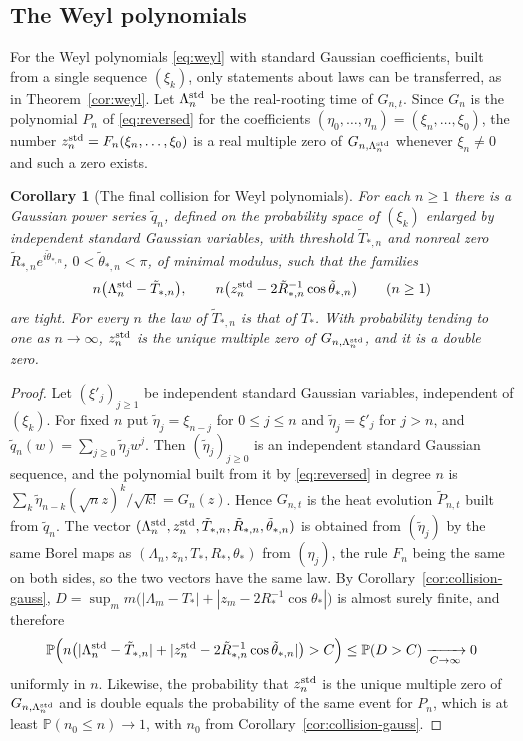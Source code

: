 \documentclass[11pt]{amsart}
\newtheorem{corollary}[theorem]{Corollary}
\theoremstyle{definition}
\theoremstyle{remark}
\numberwithin{equation}{section}
\newcommand{\PP}{\mathbb{P}}
\begin{document}
\subsection{The Weyl polynomials}\label{subsec:collision-weyl}
For the Weyl polynomials \eqref{eq:weyl} with standard Gaussian coefficients, built from a single sequence $(\xi_k)$, only statements about laws can be transferred, as in Theorem~\ref{cor:weyl}. Let $\Lambda_n^{\rm std}$ be the real-rooting time of $G_{n,t}$. Since $G_n$ is the polynomial $P_n$ of \eqref{eq:reversed} for the coefficients $(\eta_0,\dots,\eta_n)=(\xi_n,\dots,\xi_0)$, the number $z_n^{\rm std}=F_n(\xi_n,\dots,\xi_0)$ is a real multiple zero of $G_{n,\Lambda_n^{\rm std}}$ whenever $\xi_n\ne0$ and such a zero exists.

\begin{corollary}[The final collision for Weyl polynomials]\label{cor:collision-weyl}
For each $n\ge1$ there is a Gaussian power series $\tilde q_n$, defined on the probability space of $(\xi_k)$ enlarged by independent standard Gaussian variables, with threshold $\tilde T_{*,n}$ and nonreal zero $\tilde R_{*,n}e^{i\tilde\theta_{*,n}}$, $0<\tilde\theta_{*,n}<\pi$, of minimal modulus, such that the families
\[
n\bigl(\Lambda_n^{\rm std}-\tilde T_{*,n}\bigr),\qquad n\bigl(z_n^{\rm std}-2\tilde R_{*,n}^{-1}\cos\tilde\theta_{*,n}\bigr)\qquad(n\ge1)
\]
are tight. For every $n$ the law of $\tilde T_{*,n}$ is that of $T_*$. With probability tending to one as $n\to\infty$, $z_n^{\rm std}$ is the unique multiple zero of $G_{n,\Lambda_n^{\rm std}}$, and it is a double zero.
\end{corollary}

\begin{proof}
Let $(\xi'_j)_{j\ge1}$ be independent standard Gaussian variables, independent of $(\xi_k)$. For fixed $n$ put $\tilde\eta_j=\xi_{n-j}$ for $0\le j\le n$ and $\tilde\eta_j=\xi'_j$ for $j>n$, and $\tilde q_n(w)=\sum_{j\ge0}\tilde\eta_jw^j$. Then $(\tilde\eta_j)_{j\ge0}$ is an independent standard Gaussian sequence, and the polynomial built from it by \eqref{eq:reversed} in degree $n$ is $\sum_k\tilde\eta_{n-k}(\sqrt nz)^k/\sqrt{k!}=G_n(z)$. Hence $G_{n,t}$ is the heat evolution $\tilde P_{n,t}$ built from $\tilde q_n$. The vector $(\Lambda_n^{\rm std},z_n^{\rm std},\tilde T_{*,n},\tilde R_{*,n},\tilde\theta_{*,n})$ is obtained from $(\tilde\eta_j)$ by the same Borel maps as $(\Lambda_n,z_n,T_*,R_*,\theta_*)$ from $(\eta_j)$, the rule $F_n$ being the same on both sides, so the two vectors have the same law. By Corollary~\ref{cor:collision-gauss}, $D=\sup_mm\bigl(|\Lambda_m-T_*|+|z_m-2R_*^{-1}\cos\theta_*|\bigr)$ is almost surely finite, and therefore
\[
\PP\Bigl(n\bigl(|\Lambda_n^{\rm std}-\tilde T_{*,n}|+|z_n^{\rm std}-2\tilde R_{*,n}^{-1}\cos\tilde\theta_{*,n}|\bigr)>C\Bigr)\le\PP(D>C)\xrightarrow[C\to\infty]{}0
\]
uniformly in $n$. Likewise, the probability that $z_n^{\rm std}$ is the unique multiple zero of $G_{n,\Lambda_n^{\rm std}}$ and is double equals the probability of the same event for $P_n$, which is at least $\PP(n_0\le n)\to1$, with $n_0$ from Corollary~\ref{cor:collision-gauss}.
\end{proof}
\end{document}
